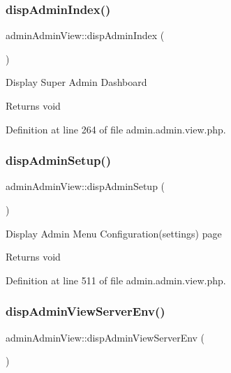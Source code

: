\subsubsection{\texorpdfstring{disp\+Admin\+Index()}{dispAdminIndex()}}
{\footnotesize\ttfamily admin\+Admin\+View\+::disp\+Admin\+Index (\begin{DoxyParamCaption}{ }\end{DoxyParamCaption})}

Display Super Admin Dashboard \begin{DoxyReturn}{Returns}
void 
\end{DoxyReturn}


Definition at line 264 of file admin.\+admin.\+view.\+php.

\hypertarget{classadminAdminView_acfa4a5d1209080974ca5fd15d04565e9}{}\label{classadminAdminView_acfa4a5d1209080974ca5fd15d04565e9} 
\subsubsection{\texorpdfstring{disp\+Admin\+Setup()}{dispAdminSetup()}}
{\footnotesize\ttfamily admin\+Admin\+View\+::disp\+Admin\+Setup (\begin{DoxyParamCaption}{ }\end{DoxyParamCaption})}

Display Admin Menu Configuration(settings) page \begin{DoxyReturn}{Returns}
void 
\end{DoxyReturn}


Definition at line 511 of file admin.\+admin.\+view.\+php.

\hypertarget{classadminAdminView_a6b110bb8ccba975a670fdfbe559f7118}{}\label{classadminAdminView_a6b110bb8ccba975a670fdfbe559f7118} 
\subsubsection{\texorpdfstring{disp\+Admin\+View\+Server\+Env()}{dispAdminViewServerEnv()}}
{\footnotesize\ttfamily admin\+Admin\+View\+::disp\+Admin\+View\+Server\+Env (\begin{DoxyParamCaption}{ }\end{DoxyParamCaption})}

